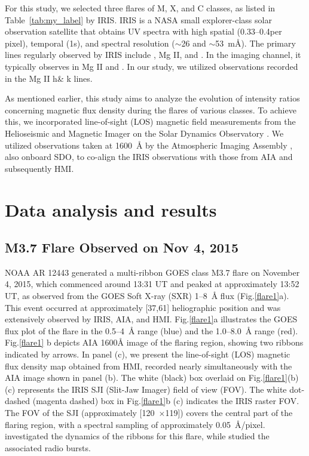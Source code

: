 For this study, we selected three flares of M, X, and C classes, as listed in Table~\ref{tab:my_label} by IRIS. IRIS is a NASA small explorer-class solar observation satellite that obtains UV spectra with high spatial (0.33{--}0.4\arcsec per pixel), temporal (1s), and spectral resolution ($\sim$26 and $\sim$53~m{\AA}). The primary lines regularly observed by IRIS include , Mg II, and . In the imaging channel, it typically observes in Mg II and . In our study, we utilized observations recorded in the Mg II h\& k lines.

As mentioned earlier, this study aims to analyze the evolution of intensity ratios concerning magnetic flux density during the flares of various classes. To achieve this, we incorporated line-of-sight (LOS) magnetic field measurements from the Helioseismic and Magnetic Imager \citep[HMI;][]{hmi} on the Solar Dynamics Observatory \citep[SDO;][]{sdo}. We utilized observations taken at 1600~{\AA} by the Atmospheric Imaging Assembly \citep[AIA;][]{aia}, also onboard SDO, to co-align the IRIS observations with those from AIA and subsequently HMI.

\section{Data analysis and results} \label{sec:dar}
\subsection{M3.7 Flare Observed on Nov 4, 2015}

NOAA AR 12443 generated a multi-ribbon GOES class M3.7 flare on November 4, 2015, which commenced around 13:31 UT and peaked at approximately 13:52 UT, as observed from the GOES Soft X-ray (SXR) 1{--}8~{\AA} flux (Fig.\ref{flare1}a). This event occurred at approximately [37\arcsec,61\arcsec] heliographic position and was extensively observed by IRIS, AIA, and HMI. Fig.\ref{flare1}a illustrates the GOES flux plot of the flare in the 0.5{--}4~{\AA} range (blue) and the 1.0{--}8.0~{\AA} range (red). Fig.\ref{flare1} b depicts AIA 1600{\AA} image of the flaring region, showing two ribbons indicated by arrows. In panel (c), we present the line-of-sight (LOS) magnetic flux density map obtained from HMI, recorded nearly simultaneously with the AIA image shown in panel (b). The white (black) box overlaid on Fig.\ref{flare1}(b) (c) represents the IRIS SJI (Slit-Jaw Imager) field of view (FOV). The white dot-dashed (magenta dashed) box in Fig.\ref{flare1}b (c) indicates the IRIS raster FOV. The FOV of the SJI (approximately [120\arcsec~$\times$119\arcsec]) covers the central part of the flaring region, with a spectral sampling of approximately 0.05~{\AA}/pixel. \cite{li17} investigated the dynamics of the ribbons for this flare, while \cite{karlick18} studied the associated radio bursts.

